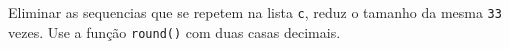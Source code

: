 \documentclass[12pt,varwidth=16cm,border=1pt]{standalone}
\begin{document}
Eliminar as sequencias que se repetem na lista \verb+c+, reduz o tamanho da mesma \verb+33+ vezes. Use a função \verb+round()+ com duas casas decimais.

\questiomtrue
\end{document}
